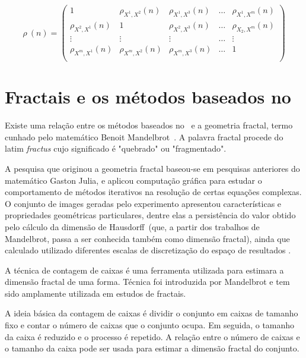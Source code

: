 \begin{equation}
  \rho~(n) = \left(\begin{matrix}
    1                     & \rho_{X^{1},X^{2}}(n) & \rho_{X^{1},X^{3}}(n) & \dots & \rho_{X^{1},X^{m}}(n) \\
    \rho_{X^{2},X^{1}}(n) & 1                     & \rho_{X^{2},X^{3}}(n) & \dots & \rho_{X_{2},X^{m}}(n) \\
    \vdots                & \vdots                & \vdots                & \dots & \vdots                \\
    \rho_{X^{m},X^{1}}(n) & \rho_{X^{m},X^{2}}(n) & \rho_{X^{m},X^{3}}(n) & \dots & 1                     \\
  \end{matrix}\right)
  \label{eq:p_dcca_matrix}
\end{equation}

\section{Fractais e os métodos baseados no \dfa}
\label{ss:dfa_fract}

Existe uma relação entre os métodos baseados no \dfa~e a geometria fractal, termo cunhado pelo matemático Benoit Mandelbrot~\cite{mandelbrot1977fractals}. A palavra fractal procede do latim \textit{fractus} cujo significado é "quebrado" ou "fragmentado".

A pesquisa que originou a geometria fractal baseou-se em pesquisas anteriores do matemático Gaston Julia, e aplicou computação gráfica para estudar o comportamento de métodos iterativos na resolução de certas equações complexas. O conjunto de images geradas pelo experimento apresentou características e propriedades geométricas particulares, dentre elas a persistência do valor obtido pelo cálculo da dimensão de Hausdorff~(que, a partir dos trabalhos de Mandelbrot, passa a ser conhecida também como dimensão fractal), ainda que calculado utilizado diferentes escalas de discretização do espaço de resultados \cite{mandelbrot1983fractal}.

A técnica de contagem de caixas é uma ferramenta utilizada para estimara a dimensão fractal de uma forma. Técnica foi introduzida por Mandelbrot e tem sido amplamente utilizada em estudos de fractais.

A ideia básica da contagem de caixas é dividir o conjunto em caixas de tamanho fixo e contar o número de caixas que o conjunto ocupa. Em seguida, o tamanho da caixa é reduzido e o processo é repetido. A relação entre o número de caixas e o tamanho da caixa pode ser usada para estimar a dimensão fractal do conjunto.

